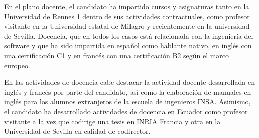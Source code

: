 En el plano docente, el candidato ha impartido cursos y asignaturas tanto en la Universidad de Rennes 1 dentro de sus actividades contractuales, como profesor visitante en la Universidad estatal de Milagro y recientemente en la universidad de Sevilla. Docencia, que en todos los casos está relacionada con la ingeniería del software y que ha sido impartida en español como hablante nativo, en inglés con una certificación C1 y en francés con una certificación B2 según el marco europeo.

En las actividades de docencia cabe destacar la actividad docente desarrollada en inglés y francés por parte del candidato, así como la elaboración de manuales en inglés para los alumnos extranjeros de la escuela de ingenieros INSA. Asimismo, el candidato ha desarrollado actividades de docencia en Ecuador como profesor visitante a la vez que codirige una tesis en INRIA Francia y otra en la Universidad de Sevilla en calidad de codirector. 

